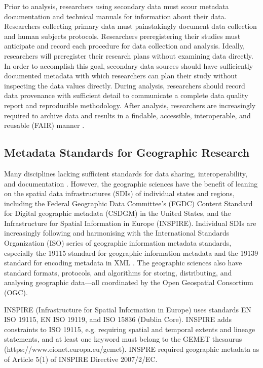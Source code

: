 \documentclass{isprs} %
\begin{document}
Prior to analysis, researchers using secondary data must scour metadata documentation and technical manuals for information about their data.
Researchers collecting primary data must painstakingly document data collection and human subjects protocols.
Researchers preregistering their studies must anticipate and record each procedure for data collection and analysis. 
Ideally, researchers will preregister their research plans without examining data directly.
In order to accomplish this goal, secondary data sources should have sufficiently documented metadata with which researchers can plan their study without inspecting the data values directly.
During analysis, researchers should record data provenance with sufficient detail to communicate a complete data quality report and reproducible methodology.
After analysis, researchers are increasingly required to archive data and results in a findable, accessible, interoperable, and reusable (FAIR) manner \citep{Wilkinson2016}.

\subsection{Metadata Standards for Geographic Research}\label{sec:Metadata}

Many disciplines lacking sufficient standards for data sharing, interoperability, and documentation \citep{NASEM2019}.
However, the geographic sciences have the benefit of leaning on the spatial data infrastructures (SDIs) of individual states and regions, including the Federal Geographic Data Committee's (FGDC) Content Standard for Digital geographic metadata (CSDGM) in the United States, and the Infrastructure for Spatial Information in Europe (INSPIRE).
Individual SDIs are increasingly following and harmonising with the International Standards Organization (ISO) series of geographic information metadata standards, especially the 19115 standard for geographic information metadata \citep{ISO2014} and the 19139 standard for encoding metadata in XML \citep{ISO2019}.
The geographic sciences also have standard formats, protocols, and algorithms for storing, distributing, and analysing geographic data---all coordinated by the Open Geospatial Consortium (OGC).

INSPIRE (Infrastructure for Spatial Information in Europe) uses standards EN ISO 19115, EN ISO 19119, and ISO 15836 (Dublin
Core). INSPIRE adds constraints to ISO 19115, e.g. requiring spatial and temporal extents and lineage statements, and at least one keyword must belong to the GEMET thesaurus (https://www.eionet.europa.eu/gemet). INSPRE required geographic metadata as of Article 5(1) of INSPIRE Directive 2007/2/EC.
\end{document}

